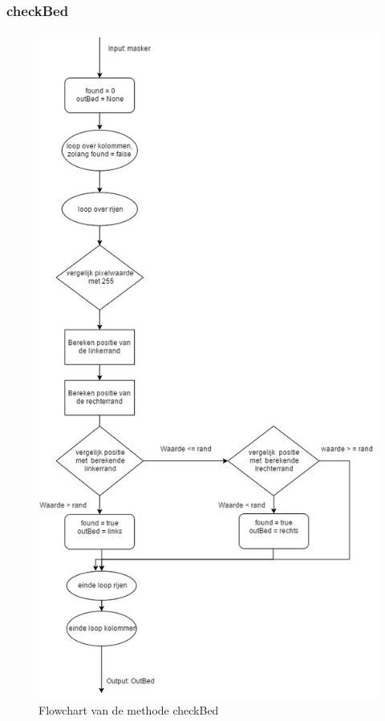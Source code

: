 \subsubsection{checkBed}
\begin{figure}[hbp]
	\includegraphics[scale=0.45]{FlowShart_checkBed}
	\caption{Flowchart van de methode checkBed}
	\label{imgFCCBe}
\end{figure}
